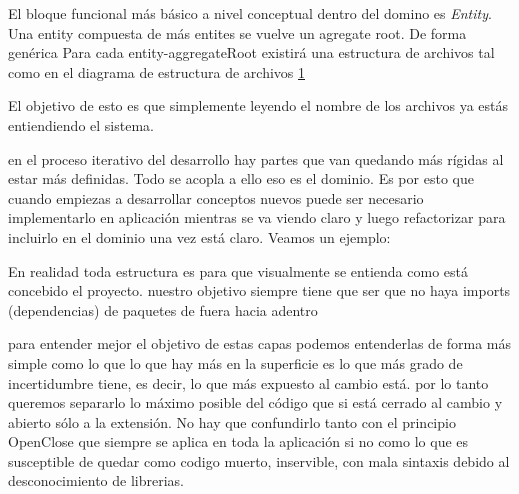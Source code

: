 

El bloque funcional más básico a nivel conceptual dentro del domino es \textit{Entity}. Una entity compuesta de más entites se vuelve un agregate root. De forma genérica Para cada entity-aggregateRoot existirá una estructura de archivos tal como en el diagrama de estructura de archivos \ref{fig:folderEntity}

\begin{figure}[h]
    \caption{}
    \label{fig:folderEntity}
\end{figure}

El objetivo de esto es que simplemente leyendo el nombre de los archivos ya estás entiendiendo el sistema.

en el proceso iterativo del desarrollo hay partes que van quedando más rígidas al estar más definidas. Todo se acopla a ello eso es el dominio. Es por esto que cuando empiezas a desarrollar conceptos nuevos puede ser necesario implementarlo en aplicación mientras se va viendo claro y luego refactorizar para incluirlo en el dominio una vez está claro.
Veamos un ejemplo:

\begin{figure}[H]
    
    \caption{}
    \label{fig:ProjectfolderStructure}
\end{figure}

En realidad toda estructura es para que visualmente se entienda como está concebido el proyecto. nuestro objetivo siempre tiene que ser que no haya imports (dependencias) de paquetes de fuera hacia adentro


para entender mejor el objetivo de estas capas podemos entenderlas de forma más simple como lo que lo que hay más en la superficie es lo que más grado de incertidumbre tiene, es decir, lo que más expuesto al cambio está. por lo tanto queremos separarlo lo máximo posible del código que si está cerrado al cambio y abierto sólo a la extensión. No hay que confundirlo tanto con el principio OpenClose que siempre se aplica en toda la aplicación si no como lo que es susceptible de quedar como codigo muerto, inservible, con mala sintaxis debido al desconocimiento de librerias.

